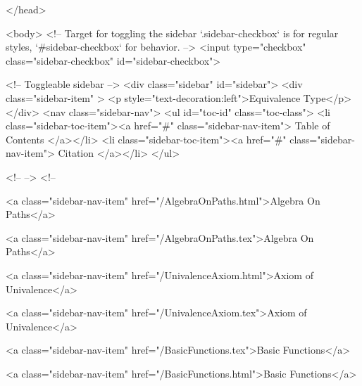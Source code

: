   
</head>




  <body>
    <!-- Target for toggling the sidebar `.sidebar-checkbox` is for regular
     styles, `#sidebar-checkbox` for behavior. -->
<input type="checkbox" class="sidebar-checkbox" id="sidebar-checkbox">

<!-- Toggleable sidebar -->
<div class="sidebar" id="sidebar">
  <div class="sidebar-item" >
    <p style="text-decoration:left">Equivalence Type</p>
  </div>
  <nav class="sidebar-nav">
    <ul id="toc-id" class="toc-class">
  <li class="sidebar-toc-item"><a href="#" class="sidebar-nav-item"> Table of Contents </a></li>
  <li class="sidebar-toc-item"><a href="#" class="sidebar-nav-item"> Citation </a></li>
</ul>


    <!--  -->
    <!-- 
      
    
      
    
      
    
      
        
      
    
      
        
          <a class="sidebar-nav-item" href="/AlgebraOnPaths.html">Algebra On Paths</a>
        
      
    
      
        
          <a class="sidebar-nav-item" href="/AlgebraOnPaths.tex">Algebra On Paths</a>
        
      
    
      
        
          <a class="sidebar-nav-item" href="/UnivalenceAxiom.html">Axiom of Univalence</a>
        
      
    
      
        
          <a class="sidebar-nav-item" href="/UnivalenceAxiom.tex">Axiom of Univalence</a>
        
      
    
      
        
          <a class="sidebar-nav-item" href="/BasicFunctions.tex">Basic Functions</a>
        
      
    
      
        
          <a class="sidebar-nav-item" href="/BasicFunctions.html">Basic Functions</a>
        
      
    
      
        
